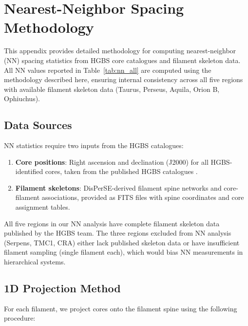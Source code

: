 \documentclass[twoside,twocolumn]{mnras}
\begin{document}
\appendix

\section{Nearest-Neighbor Spacing Methodology}
\label{app:nn_methodology}

This appendix provides detailed methodology for computing nearest-neighbor (NN) spacing statistics from HGBS core catalogues and filament skeleton data. All NN values reported in Table~\ref{tab:nn_all} are computed using the methodology described here, ensuring internal consistency across all five regions with available filament skeleton data (Taurus, Perseus, Aquila, Orion B, Ophiuchus).

\subsection{Data Sources}

NN statistics require two inputs from the HGBS catalogues:
\begin{enumerate}
    \item \textbf{Core positions}: Right ascension and declination (J2000) for all HGBS-identified cores, taken from the published HGBS catalogues \citep{Konyves2015, Konyves2020, Andre2016, Ladjelate2020}.
    \item \textbf{Filament skeletons}: DisPerSE-derived filament spine networks and core-filament associations, provided as FITS files with spine coordinates and core assignment tables.
\end{enumerate}

All five regions in our NN analysis have complete filament skeleton data published by the HGBS team. The three regions excluded from NN analysis (Serpens, TMC1, CRA) either lack published skeleton data or have insufficient filament sampling (single filament each), which would bias NN measurements in hierarchical systems.

\subsection{1D Projection Method}

For each filament, we project cores onto the filament spine using the following procedure:
\end{document}
